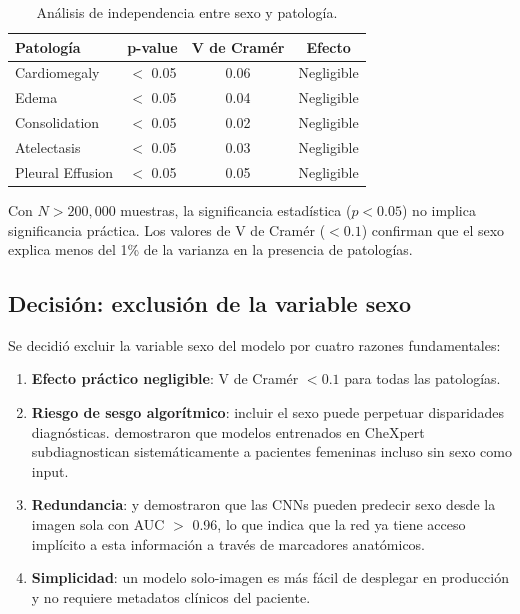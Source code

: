 \begin{table}[H]
\centering
\caption{An\'alisis de independencia entre sexo y patolog\'ia.}
\label{tab:chi2}
\small
\begin{tabular}{lccc}
\toprule
\textbf{Patolog\'ia} & \textbf{p-value} & \textbf{V de Cram\'er} & \textbf{Efecto} \\
\midrule
Cardiomegaly     & $<$ 0.05 & 0.06 & Negligible \\
Edema            & $<$ 0.05 & 0.04 & Negligible \\
Consolidation    & $<$ 0.05 & 0.02 & Negligible \\
Atelectasis      & $<$ 0.05 & 0.03 & Negligible \\
Pleural Effusion & $<$ 0.05 & 0.05 & Negligible \\
\bottomrule
\end{tabular}
\end{table}

Con $N > 200{,}000$ muestras, la significancia estad\'istica ($p < 0.05$) no implica significancia pr\'actica. Los valores de V de Cram\'er ($< 0.1$) confirman que el sexo explica menos del 1\% de la varianza en la presencia de patolog\'ias.

\subsection{Decisi\'on: exclusi\'on de la variable sexo}

Se decidi\'o excluir la variable sexo del modelo por cuatro razones fundamentales:

\begin{enumerate}
    \item \textbf{Efecto pr\'actico negligible}: V de Cram\'er $< 0.1$ para todas las patolog\'ias.
    \item \textbf{Riesgo de sesgo algor\'itmico}: incluir el sexo puede perpetuar disparidades diagn\'osticas. \cite{seyyedkalantari2021bias} demostraron que modelos entrenados en CheXpert subdiagnostican sistem\'aticamente a pacientes femeninas incluso sin sexo como input.
    \item \textbf{Redundancia}: \cite{jabbour2020shortcuts} y \cite{gichoya2022ai} demostraron que las CNNs pueden predecir sexo desde la imagen sola con AUC $>$ 0.96, lo que indica que la red ya tiene acceso impl\'icito a esta informaci\'on a trav\'es de marcadores anat\'omicos.
    \item \textbf{Simplicidad}: un modelo solo-imagen es m\'as f\'acil de desplegar en producci\'on y no requiere metadatos cl\'inicos del paciente.
\end{enumerate}

